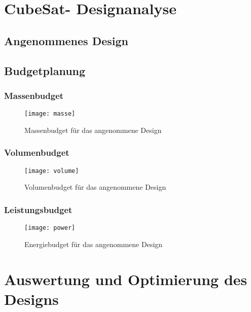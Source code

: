 		\section{CubeSat- Designanalyse}
				\subsection{Angenommenes Design}
				\subsection{Budgetplanung}
				
						\subsubsection{Massenbudget}
								
										\begin{figure}[h]
											\centering
												\texttt{[image: masse]}
											\caption{Massenbudget für das angenommene Design}
											\label{fig:masse}
										\end{figure}
										
						\subsubsection{Volumenbudget}
								
										\begin{figure}[h]
											\centering
												\texttt{[image: volume]}
											\caption{Volumenbudget für das angenommene Design}
											\label{fig:volume}
										\end{figure}
								
						\subsubsection{Leistungsbudget}
				
										\begin{figure}[h]
											\centering
												\texttt{[image: power]}
											\caption{Energiebudget für das angenommene Design}
											\label{fig:volume}
										\end{figure}
										
			\section{Auswertung und Optimierung des Designs}

				
